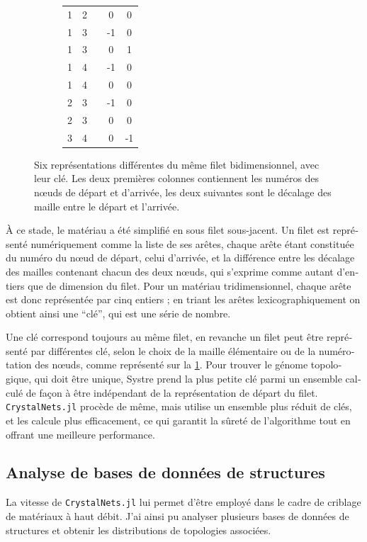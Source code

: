 \documentclass[thesis]{subfiles}
\begin{document}
\begin{otherlanguage}{french}
\begin{figure}[t]
\begin{subfigure}[b]{0.35\linewidth}
		\centering\scriptsize\begin{tabular}{ccccc}
			1&2&&0&0\\
			1&3&&-1&0\\
			1&3&&0&1\\
			1&4&&-1&0\\
			1&4&&0&0\\
			2&3&&-1&0\\
			2&3&&0&0\\
			3&4&&0&-1
		\end{tabular}
		\vspace{-0.5em}
	\end{subfigure}
	\vspace{2mm}
	\caption{Six représentations différentes du même filet bidimensionnel, avec leur clé. Les deux premières colonnes contiennent les numéros des n\oe uds de départ et d'arrivée, les deux suivantes sont le décalage des maille entre le départ et l'arrivée.} \label{fig_cles}
\end{figure}

À ce stade, le matériau a été simplifié en sous filet sous-jacent. Un filet est représenté numériquement comme la liste de ses arêtes, chaque arête étant constituée du numéro du n\oe ud de départ, celui d'arrivée, et la différence entre les décalage des mailles contenant chacun des deux n\oe uds, qui s'exprime comme autant d'entiers que de dimension du filet. Pour un matériau tridimensionnel, chaque arête est donc représentée par cinq entiers ; en triant les arêtes lexicographiquement on obtient ainsi une ``clé'', qui est une série de nombre.

Une clé correspond toujours au même filet, en revanche un filet peut être représenté par différentes clé, selon le choix de la maille élémentaire ou de la numérotation des n\oe uds, comme représenté sur la \cref{fig_cles}. Pour trouver le génome topologique, qui doit être unique, Systre prend la plus petite clé parmi un ensemble calculé de façon à être indépendant de la représentation de départ du filet. \texttt{CrystalNets.jl} procède de même, mais utilise un ensemble plus réduit de clés, et les calcule plus efficacement, ce qui garantit la sûreté de l'algorithme tout en offrant une meilleure performance.

\subsection{Analyse de bases de données de structures}

La vitesse de \texttt{CrystalNets.jl} lui permet d'être employé dans le cadre de criblage de matériaux à haut débit. J'ai ainsi pu analyser plusieurs bases de données de structures et obtenir les distributions de topologies associées.


\end{otherlanguage}
\end{document}

